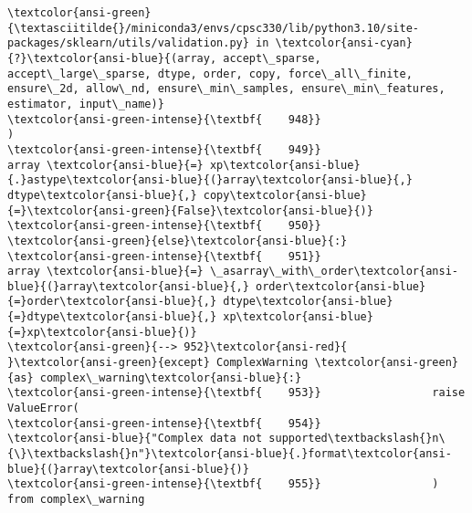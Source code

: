 \documentclass[11pt]{article}
\begin{document}
\begin{Verbatim}[commandchars=\\\{\}, frame=single, framerule=2mm, rulecolor=\color{outerrorbackground}]
\textcolor{ansi-green}{\textasciitilde{}/miniconda3/envs/cpsc330/lib/python3.10/site-packages/sklearn/utils/validation.py} in \textcolor{ansi-cyan}{?}\textcolor{ansi-blue}{(array, accept\_sparse, accept\_large\_sparse, dtype, order, copy, force\_all\_finite, ensure\_2d, allow\_nd, ensure\_min\_samples, ensure\_min\_features, estimator, input\_name)}
\textcolor{ansi-green-intense}{\textbf{    948}}                         )
\textcolor{ansi-green-intense}{\textbf{    949}}                     array \textcolor{ansi-blue}{=} xp\textcolor{ansi-blue}{.}astype\textcolor{ansi-blue}{(}array\textcolor{ansi-blue}{,} dtype\textcolor{ansi-blue}{,} copy\textcolor{ansi-blue}{=}\textcolor{ansi-green}{False}\textcolor{ansi-blue}{)}
\textcolor{ansi-green-intense}{\textbf{    950}}                 \textcolor{ansi-green}{else}\textcolor{ansi-blue}{:}
\textcolor{ansi-green-intense}{\textbf{    951}}                     array \textcolor{ansi-blue}{=} \_asarray\_with\_order\textcolor{ansi-blue}{(}array\textcolor{ansi-blue}{,} order\textcolor{ansi-blue}{=}order\textcolor{ansi-blue}{,} dtype\textcolor{ansi-blue}{=}dtype\textcolor{ansi-blue}{,} xp\textcolor{ansi-blue}{=}xp\textcolor{ansi-blue}{)}
\textcolor{ansi-green}{--> 952}\textcolor{ansi-red}{             }\textcolor{ansi-green}{except} ComplexWarning \textcolor{ansi-green}{as} complex\_warning\textcolor{ansi-blue}{:}
\textcolor{ansi-green-intense}{\textbf{    953}}                 raise ValueError(
\textcolor{ansi-green-intense}{\textbf{    954}}                     \textcolor{ansi-blue}{"Complex data not supported\textbackslash{}n\{\}\textbackslash{}n"}\textcolor{ansi-blue}{.}format\textcolor{ansi-blue}{(}array\textcolor{ansi-blue}{)}
\textcolor{ansi-green-intense}{\textbf{    955}}                 ) from complex\_warning


\end{Verbatim}
\end{document}
